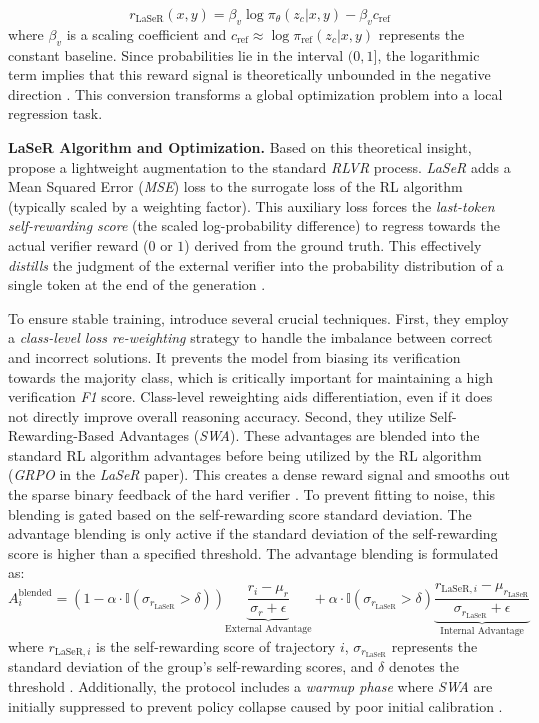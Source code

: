 \documentclass[a4paper,oneside,10pt,ngerman,english]{scrartcl}
\begin{document}
\begin{equation}
	r_{\text{LaSeR}}(x, y) = \beta_v \log \pi_\theta(z_c | x, y) - \beta_v c_{\text{ref}}
\end{equation}
where $\beta_v$ is a scaling coefficient and $c_{\text{ref}} \approx \log \pi_{\text{ref}}(z_c | x, y)$ represents the constant baseline. Since probabilities lie in the interval $(0, 1]$, the logarithmic term implies that this reward signal is theoretically unbounded in the negative direction \citep{laser}. This conversion transforms a global optimization problem into a local regression task.

\textbf{LaSeR Algorithm and Optimization.} Based on this theoretical insight, \citet{laser} propose a lightweight augmentation to the standard \textit{RLVR} process. \textit{LaSeR} adds a Mean Squared Error (\textit{MSE}) loss to the surrogate loss of the RL algorithm (typically scaled by a weighting factor). This auxiliary loss forces the \textit{last-token self-rewarding score} (the scaled log-probability difference) to regress towards the actual verifier reward ($0$ or $1$) derived from the ground truth. This effectively \textit{distills} the judgment of the external verifier into the probability distribution of a single token at the end of the generation \citep{laser}.

To ensure stable training, \citet{laser} introduce several crucial techniques. First, they employ a \textit{class-level loss re-weighting} strategy to handle the imbalance between correct and incorrect solutions. It prevents the model from biasing its verification towards the majority class, which is critically important for maintaining a high verification \textit{F1} score. Class-level reweighting aids differentiation, even if it does not directly improve overall reasoning accuracy. Second, they utilize Self-Rewarding-Based Advantages (\textit{SWA}). These advantages are blended into the standard RL algorithm advantages before being utilized by the RL algorithm (\textit{GRPO} in the \textit{LaSeR} paper). This creates a dense reward signal and smooths out the sparse binary feedback of the hard verifier \citep{laser}. To prevent fitting to noise, this blending is gated based on the self-rewarding score standard deviation. The advantage blending is only active if the standard deviation of the self-rewarding score is higher than a specified threshold. The advantage blending is formulated as:
\begin{equation}
	A^{\text{blended}}_i = (1 - \alpha \cdot \mathbb{I}(\sigma_{r_{\text{LaSeR}}} > \delta)) \underbrace{\frac{r_i - \mu_r}{\sigma_r + \epsilon}}_{\text{External Advantage}} + \alpha \cdot \mathbb{I}(\sigma_{r_{\text{LaSeR}}} > \delta) \underbrace{\frac{r_{\text{LaSeR}, i} - \mu_{r_{\text{LaSeR}}}}{\sigma_{r_{\text{LaSeR}}} + \epsilon}}_{\text{Internal Advantage}}
\end{equation}
where $r_{\text{LaSeR}, i}$ is the self-rewarding score of trajectory $i$, $\sigma_{r_{\text{LaSeR}}}$ represents the standard deviation of the group's self-rewarding scores, and $\delta$ denotes the threshold \citep{laser}. Additionally, the protocol includes a \textit{warmup phase} where \textit{SWA} are initially suppressed to prevent policy collapse caused by poor initial calibration \citep{laser}.
\end{document}
